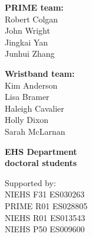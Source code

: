 \documentclass{beamer}
\begin{document}
{\begin{columns}

\begin{flushright}
\scriptsize
{\color{matbluedark} \textbf{PRIME team:}} \\
            Robert Colgan \\
            John Wright \\
            Jingkai Yan \\
            Junhui Zhang \\

\vspace{4mm}

{\color{matbluedark} \textbf{Wristband team:}} \\
Kim Anderson \\
Lisa Bramer \\
Haleigh Cavalier \\
Holly Dixon \\
Sarah McLarnan \\

\vspace{4mm}

{\color{matbluedark} \textbf{EHS Department \\ doctoral students}}

\vspace{4mm}

{\tiny\color{gray}Supported by: \\
NIEHS F31 ES030263 \\
PRIME R01 ES028805 \\
NIEHS R01 ES013543 \\
NIEHS P50 ES009600 \\
}

\end{flushright}

\end{columns}
}
\end{document}
